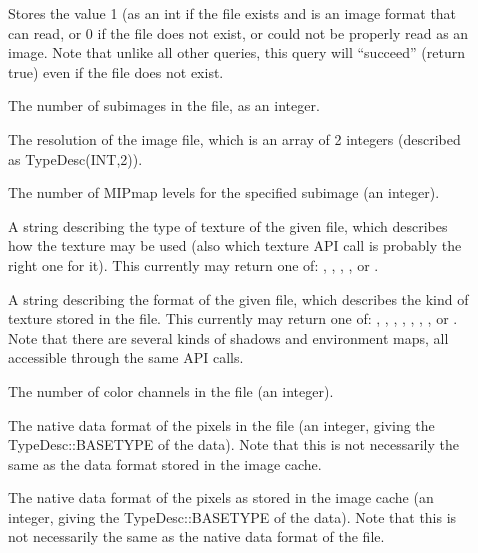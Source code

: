 \begin{description}
\item[\spc] \spc
\vspace{-12pt} 

\item[\rm {}] Stores the value 1 (as an {\cf int} if the file
exists and is an image format that \product can read, or 0 if the file
does not exist, or could not be properly read as an image. Note that
unlike all other queries, this query will ``succeed'' (return {\cf true})
even if the file does not exist.

\item[\rm {}] The number of subimages in the file, as an integer.

\item[\rm {}] The resolution of the image file, which
is an array of 2 integers (described as {\cf TypeDesc(INT,2)}).

\item[\rm {}] The number of MIPmap levels for the specified
subimage (an integer).

\item[\rm {}] A string describing the type of texture
of the given file, which describes how the texture may be used (also
which texture API call is probably the right one for it).
This currently may return one of: , ,
, , 
or .

\item[\rm {}] A string describing the format of the
given file, which describes the kind of texture stored in the file.
This currently may return one of: , ,
, , , , , or .
Note that there are several kinds of shadows and environment maps,
all accessible through the same API calls.

\item[\rm {}] The number of color channels in the file 
(an integer).

\item[\rm {}] The native data format of the pixels in the
  file (an integer, giving the {\cf TypeDesc::BASETYPE} of the data).
  Note that this is not necessarily the same as the data format stored
  in the image cache.

\item[\rm {}] The native data format of the pixels as
  stored in the image cache (an integer, giving the {\cf
    TypeDesc::BASETYPE} of the data).  Note that this is not necessarily
  the same as the native data format of the file.


\end{description}
